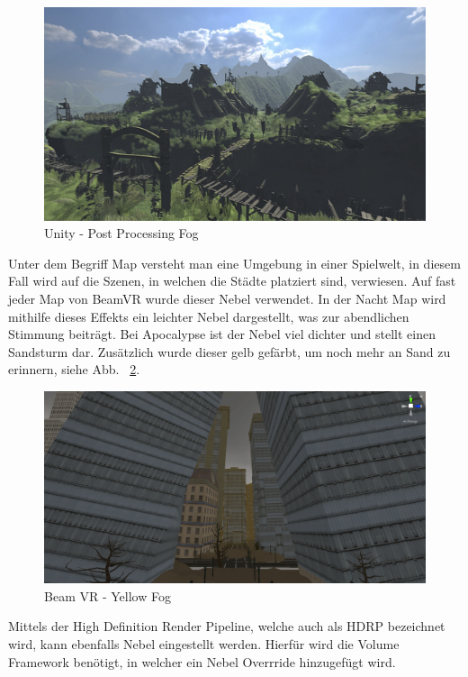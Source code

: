 \begin {figure}
    \centering
    \includegraphics[scale=0.9]{pics/unity-post-processing-fog}
    \caption{Unity - Post Processing Fog}
    \label{fig:unity_post_processing_fog}
\end {figure}
Unter dem Begriff Map versteht man eine Umgebung in einer Spielwelt, in diesem Fall wird auf die Szenen, in welchen die Städte platziert sind, verwiesen.
Auf fast jeder Map von BeamVR wurde dieser Nebel verwendet.
In der Nacht Map wird mithilfe dieses Effekts ein leichter Nebel dargestellt, was zur abendlichen Stimmung beitr\"agt.
Bei Apocalypse ist der Nebel viel dichter und stellt einen Sandsturm dar. Zus\"atzlich wurde dieser gelb gef\"arbt, um noch mehr an Sand zu erinnern, siehe Abb. ~\ref{fig:beamvr_yellow_fog}.

\begin {figure}
    \centering
    \includegraphics[scale=0.3]{pics/beamvr_yellow_fog}
    \caption{Beam VR - Yellow Fog}
    \label{fig:beamvr_yellow_fog}
\end {figure}

Mittels der High Definition Render Pipeline, welche auch als HDRP bezeichnet wird, kann ebenfalls Nebel eingestellt werden.
Hierfür wird die Volume Framework benötigt, in welcher ein Nebel Overrride hinzugefügt wird.

